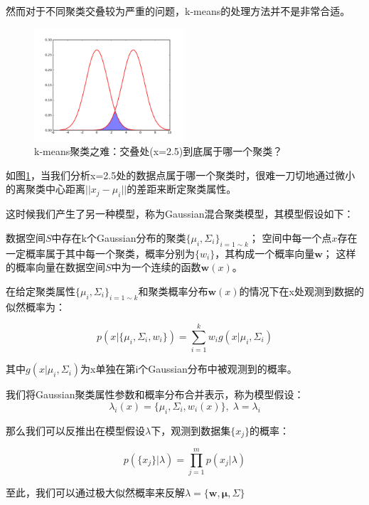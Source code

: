 然而对于不同聚类交叠较为严重的问题，k-means的处理方法并不是非常合适。
\begin{figure}[htbp]
   \centering
   \includegraphics[width=0.5\textwidth]{kMeansProblem.png} %
   \caption{k-means聚类之难：交叠处(x=2.5)到底属于哪一个聚类？}
   \label{fig:kmeansproblem}
\end{figure}

如图\ref{fig:kmeansproblem}，当我们分析x=2.5处的数据点属于哪一个聚类时，很难一刀切地通过微小的离聚类中心距离$||x_j - \mu_i||$的差距来断定聚类属性。

这时候我们产生了另一种模型，称为Gaussian混合聚类模型，其模型假设如下：

数据空间$S$中存在k个Gaussian分布的聚类$\{\mu_i, \Sigma_i\}_{i = 1\sim k}$；
空间中每一个点$x$存在一定概率属于其中每一个聚类，概率分别为$\{w_i\}$，其构成一个概率向量$\mathbf{w}$； 这样的概率向量在数据空间$S$中为一个连续的函数$\mathbf{w}(x)$。

在给定聚类属性$\{\mu_i, \Sigma_i\}_{i = 1\sim k}$和聚类概率分布$\mathbf{w}(x)$的情况下在x处观测到数据的似然概率为：

\begin{equation}
p(x|\{\mu_i, \Sigma_i, w_i \}) = \sum^k_{i=1} w_i g(x|\mu_i, \Sigma_i)
\end{equation}

其中$g(x|\mu_i, \Sigma_i)$为x单独在第i个Gaussian分布中被观测到的概率。

我们将Gaussian聚类属性参数和概率分布合并表示，称为模型假设：
$$\lambda_i(x) = \{\mu_i, \Sigma_i, w_i(x)\}, \; \lambda = {\lambda_i}$$

那么我们可以反推出在模型假设$\lambda$下，观测到数据集$\{x_j\}$的概率：

\begin{equation}
p(\{x_j\}|\lambda) = \prod^m_{j=1} p(x_j|\lambda)
\end{equation}

至此，我们可以通过极大似然概率来反解$\lambda = \{\mathbf{w}, \mathbf{\mu}, \Sigma \}$

